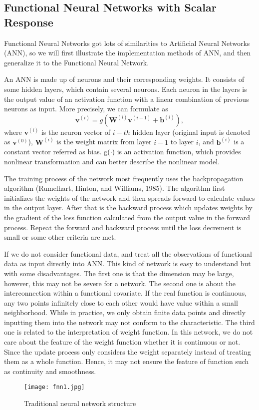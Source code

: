 \subsection{Functional Neural Networks with Scalar Response}
Functional Neural Networks got lots of similarities to Artificial Neural Networks (ANN), so we will first illustrate the implementation methods of ANN, and then generalize it to the Functional Neural Network.

An ANN is made up of neurons and their corresponding weights. It consists of some hidden layers, which contain several neurons. Each neuron in the layers is the output value of an activation function with a linear combination of previous neurons as input. More precisely, we can formulate as \\
$$\bm{v}^{(i)}=g\left(\bm{W}^{\left(i\right)}\bm{v}^{\left(i-1\right)}+\bm{b}^{\left(i\right)}\right),$$
where $\bm v^{(i)}$ is the neuron vector of $i-th$ hidden layer (original input is denoted as $\bm v^{(0)}$), $\bm W^{(i)}$ is the weight matrix from layer $i-1$ to layer $i$, and $\bm{b}^{(i)}$ is a constant vector referred as bias. g($\cdot$) is an activation function, which provides nonlinear transformation and can better describe the nonlinear model.

The training process of the network most frequently uses the backpropagation algorithm (Rumelhart, Hinton, and Williams, 1985). The algorithm first initializes the weights of the network and then spreads forward to calculate values in the output layer. After that is the backward process which updates weights by the gradient of the loss function calculated from the output value in the forward process. Repeat the forward and backward process until the loss decrement is small or some other criteria are met.

If we do not consider functional data, and treat all the observations of functional data as input directly into ANN. This kind of network is easy to understand but with some disadvantages. The first one is that the dimension may be large, however, this may not be severe for a network. The second one is about the interconnection within a functional covariate. If the real function is continuous, any two points infinitely close to each other would have value within a small neighborhood. While in practice, we only obtain finite data points and directly inputting them into the network may not conform to the characteristic. The third one is related to the interpretation of weight function. In this network, we do not care about the feature of the weight function whether it is continuous or not. Since the update process only considers the weight separately instead of treating them as a whole function. Hence, it may not ensure the feature of function such as continuity and smoothness.
\begin{figure}[H] %
\centering %
\texttt{[image: fnn1.jpg]} %
\caption{Traditional neural network structure} %
\label{fig: fnn1} %
\end{figure}

